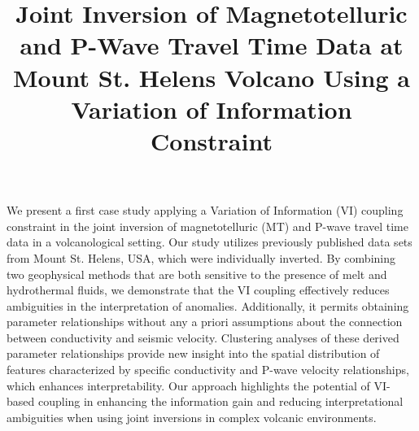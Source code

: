 \documentclass[a4paper]{article}
\begin{document}

\Large

\title{Joint Inversion of Magnetotelluric and P-Wave Travel Time Data at Mount St. Helens Volcano Using a Variation of Information Constraint}





We present a first case study applying a Variation of Information (VI) coupling constraint in the joint inversion of magnetotelluric (MT) and P-wave travel time data in a volcanological setting. Our study utilizes previously published data sets from Mount St. Helens, USA, which were individually inverted. By combining two geophysical methods that are both sensitive to the presence of melt and hydrothermal fluids, we demonstrate that the VI coupling effectively reduces ambiguities in the interpretation of anomalies. Additionally, it permits obtaining parameter relationships without any a priori assumptions about the connection between conductivity and seismic velocity. Clustering analyses of these derived parameter relationships provide new insight into the spatial distribution of features characterized by specific conductivity and P-wave velocity relationships, which enhances interpretability. Our approach highlights the potential of VI-based coupling in enhancing the information gain and reducing interpretational ambiguities when using joint inversions in complex volcanic environments.
\end{document}
